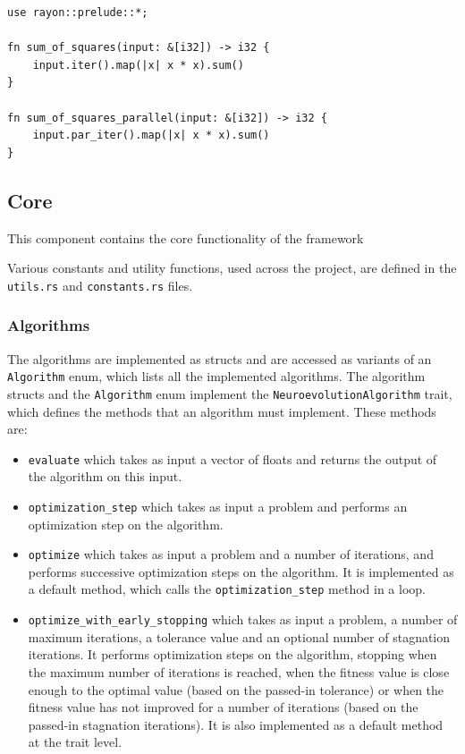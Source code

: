 \begin{lstlisting}[label=lst:sum_of_squares,caption=Sum of squares,float,frame=tb]
use rayon::prelude::*;

fn sum_of_squares(input: &[i32]) -> i32 {
    input.iter().map(|x| x * x).sum()
}

fn sum_of_squares_parallel(input: &[i32]) -> i32 {
    input.par_iter().map(|x| x * x).sum()
}
\end{lstlisting}


\subsection{Core}

This component contains the core functionality of the framework

Various constants and utility functions, used across the project, are defined in the \texttt{utils.rs} and \texttt{constants.rs} files.

\subsubsection{Algorithms}

The algorithms are implemented as structs and are accessed as variants of an \texttt{Algorithm} enum, which lists all the implemented algorithms.
The algorithm structs and the \texttt{Algorithm} enum implement the \texttt{NeuroevolutionAlgorithm} trait, which defines the methods that an algorithm must implement.
These methods are:

\begin{itemize}
    \item \texttt{evaluate} which takes as input a vector of floats and returns the output of the algorithm on this input.
    \item \texttt{optimization\_step} which takes as input a problem and performs an optimization step on the algorithm.
    \item \texttt{optimize} which takes as input a problem and a number of iterations, and performs successive optimization steps on the algorithm.
        It is implemented as a default method, which calls the \texttt{optimization\_step} method in a loop.
    \item \texttt{optimize\_with\_early\_stopping} which takes as input a problem, a number of maximum iterations, a tolerance value and an optional number of
        stagnation iterations. It performs optimization steps on the algorithm, stopping when the maximum number of iterations is reached, when the fitness value
        is close enough to the optimal value (based on the passed-in tolerance) or when the fitness value has not improved for a number of iterations (based on the
        passed-in stagnation iterations). It is also implemented as a default method at the trait level.
\end{itemize}

